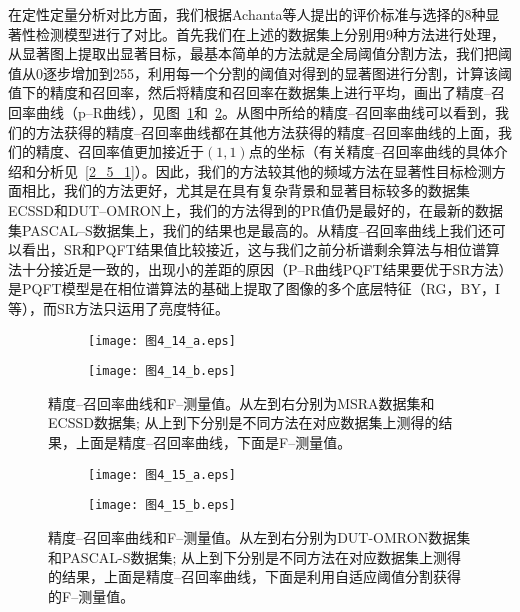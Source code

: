 在定性定量分析对比方面，我们根据Achanta等人\cite{AchantaCVPR2009Frequency}提出的评价标准与选择的8种显著性检测模型进行了对比。首先我们在上述的数据集上分别用9种方法进行处理，从显著图上提取出显著目标，最基本简单的方法就是全局阈值分割方法\cite{王岩2012注意}，我们把阈值从0逐步增加到255，利用每一个分割的阈值对得到的显著图进行分割，计算该阈值下的精度和召回率，然后将精度和召回率在数据集上进行平均，画出了精度--召回率曲线（p--R曲线），见图~\ref{图4_14}和~\ref{图4_15}。从图中所给的精度--召回率曲线可以看到，我们的方法获得的精度--召回率曲线都在其他方法获得的精度--召回率曲线的上面，我们的精度、召回率值更加接近于$(1,1)$点的坐标（有关精度--召回率曲线的具体介绍和分析见~\ref{2_5_1}）。因此，我们的方法较其他的频域方法在显著性目标检测方面相比，我们的方法更好，尤其是在具有复杂背景和显著目标较多的数据集ECSSD\cite{YanQiongCVPR2013Hierarchical}和DUT--OMRON\cite{YangChuanCVPR2013Manifold}上，我们的方法得到的PR值仍是最好的，在最新的数据集PASCAL--S数据集\cite{LiYinCVPR2014Secrets}上，我们的结果也是最高的。从精度--召回率曲线上我们还可以看出，SR和PQFT结果值比较接近，这与我们之前分析谱剩余算法与相位谱算法十分接近是一致的，出现小的差距的原因（P--R曲线PQFT结果要优于SR方法）是PQFT模型是在相位谱算法的基础上提取了图像的多个底层特征（RG，BY，I等），而SR方法只运用了亮度特征。
\begin{figure}[h]
  \centering%
  \begin{subfigure}{5.5cm}
    \texttt{[image: 图4\_14\_a.eps]}
    \caption{}
  \end{subfigure}
  \hspace{4em}%
  \begin{subfigure}{0.45\textwidth}
    \texttt{[image: 图4\_14\_b.eps]}
    \caption{}
  \end{subfigure}
  \caption{精度--召回率曲线和F--测量值。从左到右分别为MSRA数据集和ECSSD数据集; 从上到下分别是不同方法在对应数据集上测得的结果，上面是精度--召回率曲线，下面是F--测量值。}
  \label{图4_14}
\end{figure}
\begin{figure}[h]
  \centering%
  \begin{subfigure}{5.5cm}
    \texttt{[image: 图4\_15\_a.eps]}
    \caption{}
  \end{subfigure}
  \hspace{4em}%
  \begin{subfigure}{0.45\textwidth}
    \texttt{[image: 图4\_15\_b.eps]}
    \caption{}
  \end{subfigure}
  \caption{精度--召回率曲线和F--测量值。从左到右分别为DUT-OMRON数据集和PASCAL-S数据集; 从上到下分别是不同方法在对应数据集上测得的结果，上面是精度--召回率曲线，下面是利用自适应阈值分割获得的F--测量值。}
  \label{图4_15}
\end{figure}

